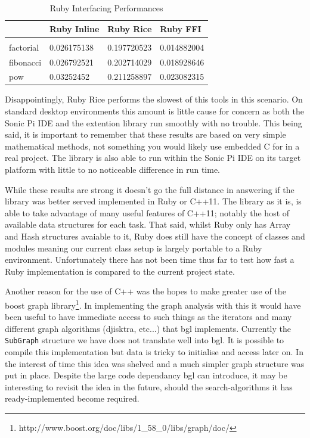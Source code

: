 \documentclass[11pt, abstracton, twoside, titlepage=true]{scrartcl}
\begin{document}
\begin{table}[h]
	\centering
	\caption{Ruby Interfacing Performances \cite{amber}} \label{ruby}

	\begin{tabular}{llll}
	          \\
	          & Ruby Inline & Ruby Rice   & Ruby FFI  \\ \hline
	          \\
	factorial & 0.026175138 & 0.197720523 & 0.014882004  \\
	fibonacci & 0.026792521 & 0.202714029 & 0.018928646  \\
	pow       & 0.03252452  & 0.211258897 & 0.023082315
	\end{tabular}
\end{table}

Disappointingly, Ruby Rice performs the slowest of this tools in this scenario. 
On standard desktop environments this amount is little cause for concern as both
the Sonic Pi IDE and the extention library run smoothly with no trouble. This being 
said, it is important to remember that these results are based on very simple 
mathematical methods, not something you would likely use embedded C for in a real 
project. The library is also able to run within the Sonic Pi IDE on its target 
platform with little to no noticeable difference in run time.

While these results are strong it doesn't go the full distance in answering if the
library was better served implemented in Ruby or C++11. The library as it is, is able
to take advantage of many useful features of C++11; notably the host of available
data structures for each task. That said, whilst Ruby only has Array and Hash 
structures avaiable to it, Ruby does still have the concept of classes and modules 
meaning our current class setup is largely portable to a Ruby environment. 
Unfortunately there has not been time thus far to test how fast a Ruby implementation
is compared to the current project state.

Another reason for the use of C++ was the hopes to make greater use of the boost
graph library\footnote{http://www.boost.org/doc/libs/1\_58\_0/libs/graph/doc/}. 
In implementing the graph analysis with this it would have been useful to have
immediate access to such things as the iterators and many different graph algorithms
(djisktra, etc...) that bgl implements. Currently the \texttt{SubGraph} structure
we have does not translate well into bgl. It is possible to compile this 
implementation but data is tricky to initialise and access later on. In the interest
of time this idea was shelved and a much simpler graph structure was put in place.
Despite the large code dependancy bgl can introduce, it may be interesting to
revisit the idea in the future, should the search-algorithms it has ready-implemented
become required.
\end{document}
